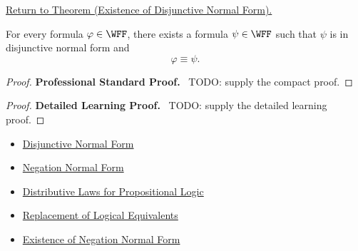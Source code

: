\newpage
{}
\label{prf:existence-disjunctive-normal-form-propositional-logic}

\begin{remark*}[Return]
\hyperref[thm:existence-disjunctive-normal-form-propositional-logic]{Return to Theorem (Existence of Disjunctive Normal Form).}
\end{remark*}

\begin{theorem*}
For every formula \(\varphi\in\WFF\), there exists a formula
\(\psi\in\WFF\) such that \(\psi\) is in disjunctive normal form and
\[
\varphi\equiv\psi.
\]
\end{theorem*}

\begin{proof}
\textbf{Professional Standard Proof.}~
TODO: supply the compact proof.
\end{proof}

\begin{proof}
\textbf{Detailed Learning Proof.}~
TODO: supply the detailed learning proof.
\end{proof}

\begin{remark*}
\end{remark*}

\begin{dependencies}
\begin{itemize}
  \item \hyperref[def:disjunctive-normal-form-propositional-logic]{Disjunctive Normal Form}
  \item \hyperref[def:negation-normal-form-propositional-logic]{Negation Normal Form}
  \item \hyperref[thm:distributive-laws-propositional-logic]{Distributive Laws for Propositional Logic}
  \item \hyperref[thm:replacement-of-logical-equivalents-propositional-logic]{Replacement of Logical Equivalents}
  \item \hyperref[thm:existence-negation-normal-form-propositional-logic]{Existence of Negation Normal Form}
\end{itemize}
\end{dependencies}

\clearpage
